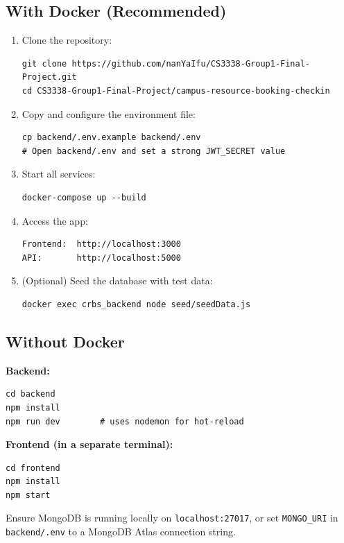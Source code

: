 \documentclass[12pt]{article}
\begin{document}
\subsection{With Docker (Recommended)}
\begin{enumerate}
    \item Clone the repository:
\begin{verbatim}
git clone https://github.com/nanYaIfu/CS3338-Group1-Final-Project.git
cd CS3338-Group1-Final-Project/campus-resource-booking-checkin
\end{verbatim}

    \item Copy and configure the environment file:
\begin{verbatim}
cp backend/.env.example backend/.env
# Open backend/.env and set a strong JWT_SECRET value
\end{verbatim}

    \item Start all services:
\begin{verbatim}
docker-compose up --build
\end{verbatim}

    \item Access the app:
\begin{verbatim}
Frontend:  http://localhost:3000
API:       http://localhost:5000
\end{verbatim}

    \item (Optional) Seed the database with test data:
\begin{verbatim}
docker exec crbs_backend node seed/seedData.js
\end{verbatim}
\end{enumerate}

\subsection{Without Docker}

\textbf{Backend:}
\begin{verbatim}
cd backend
npm install
npm run dev        # uses nodemon for hot-reload
\end{verbatim}

\textbf{Frontend (in a separate terminal):}
\begin{verbatim}
cd frontend
npm install
npm start
\end{verbatim}

Ensure MongoDB is running locally on \texttt{localhost:27017}, or set \texttt{MONGO\_URI} in \texttt{backend/.env} to a MongoDB Atlas connection string.
\end{document}
